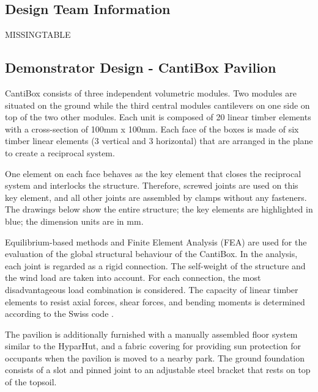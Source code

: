 \subsection{Design Team Information}
\label{subsection:exploration-5-design-team-information}

MISSINGTABLE

\subsection{Demonstrator Design - CantiBox Pavilion}
\label{subsection:exploration-5-demonstrator-design-cantibox-pavilion}

CantiBox consists of three independent volumetric modules. Two modules are situated on the ground while the third central modules cantilevers on one side on top of the two other modules. Each unit is composed of 20 linear timber elements with a cross-section of 100mm x 100mm. Each face of the boxes is made of six timber linear elements (3 vertical and 3 horizontal) that are arranged in the plane to create a reciprocal system. 




One element on each face behaves as the key element that closes the reciprocal system and interlocks the structure. Therefore, screwed joints are used on this key element, and all other joints are assembled by clamps without any fasteners. The drawings below show the entire structure; the key elements are highlighted in blue; the dimension units are in mm. 




Equilibrium-based methods and Finite Element Analysis (FEA) are used for the evaluation of the global structural behaviour of the CantiBox. In the analysis, each joint is regarded as a rigid connection. The self-weight of the structure and the wind load are taken into account. For each connection, the most disadvantageous load combination is considered. The capacity of linear timber elements to resist axial forces, shear forces, and bending moments is determined according to the Swiss code \parencite{swissstandardsassociationSIA265Timber2003}.

The pavilion is additionally furnished with a manually assembled floor system similar to the HyparHut, and a fabric covering for providing sun protection for occupants when the pavilion is moved to a nearby park. The ground foundation consists of a slot and pinned joint to an adjustable steel bracket that rests on top of the topsoil.

